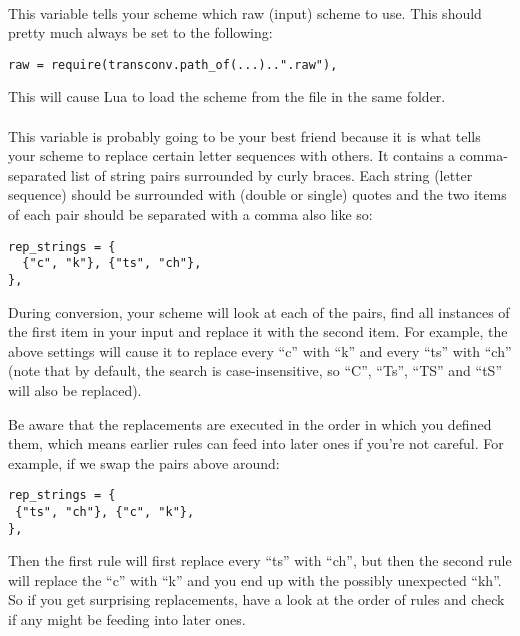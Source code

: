 \documentclass{ltxdockit}
\begin{document}
\paragraph{}

This variable tells your scheme which raw (input) scheme to use. This should
pretty much always be set to the following:

\begin{lstlisting}
raw = require(transconv.path_of(...)..".raw"),
\end{lstlisting}

This will cause Lua to load the scheme from the  file in the same
folder.

\paragraph{}

This variable is probably going to be your best friend because it is what tells
your scheme to replace certain letter sequences with others. It contains a
comma-separated list of string pairs surrounded by curly braces. Each string
(letter sequence) should be surrounded with (double or single) quotes and the
two items of each pair should be separated with a comma also like so:

\begin{lstlisting}
rep_strings = {
  {"c", "k"}, {"ts", "ch"},
},
\end{lstlisting}

During conversion, your scheme will look at each of the pairs, find all
instances of the first item in your input and replace it with the second item.
For example, the above settings will cause it to replace every \enquote{c} with
\enquote{k} and every \enquote{ts} with \enquote{ch} (note that by
  default, the search is case-insensitive, so \enquote{C}, \enquote{Ts},
\enquote{TS} and \enquote{tS} will also be replaced).

Be aware that the replacements are executed in the order in which you defined
them, which means earlier rules can feed into later ones if you're not careful.
For example, if we swap the pairs above around:

\begin{lstlisting}
rep_strings = {
 {"ts", "ch"}, {"c", "k"},
},
\end{lstlisting}

Then the first rule will first replace every \enquote{ts} with \enquote{ch}, but
then the second rule will replace the \enquote{c} with \enquote{k} and you end
up with the possibly unexpected \enquote{kh}. So if you get surprising
replacements, have a look at the order of rules and check if any might be
feeding into later ones.
\end{document}
